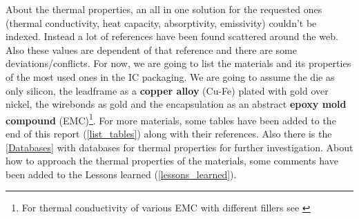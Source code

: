 \documentclass[final]{cubedoc}
\begin{document}
	
	About the thermal properties, an all in one solution for the requested ones (thermal conductivity, heat capacity, absorptivity, emissivity) couldn't be indexed. Instead a lot of references have been found scattered around the web. Also these values are dependent of that reference and there are some deviations/conflicts. For now, we are going to list the materials and its properties of the most used ones in the IC packaging. We are going to assume the die as only silicon, the leadframe as a \textbf{copper alloy} (Cu-Fe) plated with gold over nickel, the wirebonds as gold and the encapsulation as an abstract \textbf{epoxy mold compound} (EMC)\footnote{For thermal conductivity of various EMC with different fillers see \cite{caplinqepoxcondu}}. For more materials, some tables have been added to the end of this report (\cref{list_tables}) along with their references. Also there is the \cref{Databases} with databases for thermal properties for further investigation. About how to approach the thermal properties of the materials, some comments have been added to the Lessons learned (\cref{lessons_learned}).
	
	\begin{table}[h!]
		\centering
		\caption{Material Bulk properties of QFP}
		\label{tab:my_label}
	\end{table}
	
\end{document}
